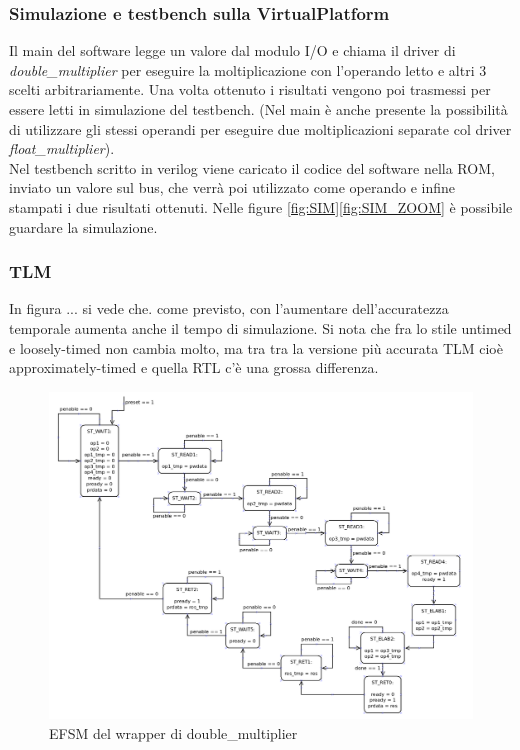 \documentclass[]{IEEEtran}
\begin{document}
\subsubsection{Simulazione e testbench sulla VirtualPlatform}
Il main del software legge un valore dal modulo I/O e chiama il driver di \textit{double\_multiplier} per eseguire la moltiplicazione con l'operando letto e altri 3 scelti arbitrariamente. Una volta ottenuto i risultati vengono poi trasmessi per essere letti in simulazione del testbench. (Nel main è anche presente la possibilità di utilizzare gli stessi operandi per eseguire due moltiplicazioni separate col driver \textit{float\_multiplier}).
\\Nel testbench scritto in verilog viene caricato il codice del software nella ROM, inviato un valore sul bus, che verrà poi utilizzato come operando e infine stampati i due risultati ottenuti. Nelle figure \ref{fig:SIM}\ref{fig:SIM_ZOOM} è possibile guardare la simulazione.


\subsubsection{TLM}
In figura ... si vede che. come previsto, con l'aumentare dell'accuratezza temporale aumenta anche il tempo di simulazione. Si nota che fra lo stile untimed e loosely-timed non cambia molto, ma tra tra la versione più accurata TLM cioè approximately-timed e quella RTL c'è una grossa differenza.






\nocite{*}


\appendix


\begin{figure}[bt]
    \centering
    \includegraphics[width=\textwidth]{figures/EFSM_wrapper.png}
    \caption{EFSM del wrapper di double\_multiplier}
    \label{fig:EFSM_WRAPPER}
\end{figure}
\end{document}
